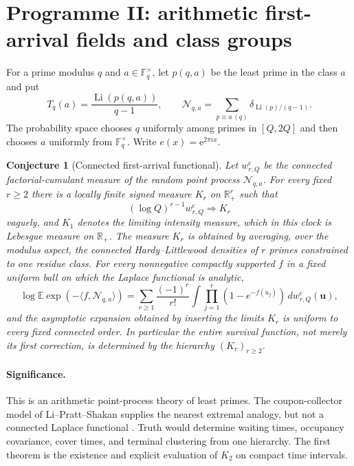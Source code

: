 \documentclass[11pt]{article}
\newtheorem{conjecture}{Conjecture}
\newcommand{\Li}{\operatorname{Li}}
\newcommand{\E}{\mathbb E}
\newcommand{\Fq}{\mathbb F}
\newcommand{\R}{\mathbb R}
\newcommand{\e}{\mathrm e}
\begin{document}
\section{Programme II: arithmetic first-arrival fields and class groups}

For a prime modulus $q$ and $a\in\Fq_q^\times$, let $p(q,a)$ be the least prime in the
class $a$ and put
\[
 T_q(a)=\frac{\Li(p(q,a))}{q-1},\qquad
 \mathcal N_{q,a}=\sum_{p\equiv a\, (q)}
 \delta_{\Li(p)/(q-1)}.
\]
The probability space chooses $q$ uniformly among primes in $[Q,2Q]$ and then chooses
$a$ uniformly from $\Fq_q^\times$.  Write $e(x)=\e^{2\pi ix}$.

\begin{conjecture}[Connected first-arrival functional]\label{c6}
Let $w^{\mathrm c}_{r,Q}$ be the connected factorial-cumulant measure of the random point
process $\mathcal N_{q,a}$.  For every fixed $r\ge2$ there is a locally finite signed
measure $K_r$ on $\R_+^r$ such that
\[
 (\log Q)^{r-1}w^{\mathrm c}_{r,Q}\Longrightarrow K_r
\]
vaguely, and $K_1$ denotes the limiting intensity measure, which in this clock is
Lebesgue measure on $\R_+$.  The measure $K_r$ is obtained by averaging, over the
modulus aspect, the connected Hardy--Littlewood densities of $r$ primes constrained to
one residue class.  For every nonnegative compactly supported $f$ in a fixed uniform ball on which the
Laplace functional is analytic,
\[
 \log\E\exp(-\langle f,\mathcal N_{q,a}\rangle)
 =\sum_{r\ge1}\frac{(-1)^r}{r!}
 \int\prod_{j=1}^r(1-e^{-f(u_j)})\,dw^{\mathrm c}_{r,Q}(\mathbf u),
\]
and the asymptotic expansion obtained by inserting the limits $K_r$ is uniform to every
fixed connected order.  In particular the entire survival function, not merely its
first correction, is determined by the hierarchy $(K_r)_{r\ge2}$.
\end{conjecture}

\paragraph{Significance.}
This is an arithmetic point-process theory of least primes.  The coupon-collector model
of Li--Pratt--Shakan supplies the nearest extremal analogy, but not a connected Laplace
functional \cite{LPS}.  Truth would determine waiting times, occupancy covariance,
cover times, and terminal clustering from one hierarchy.  The first theorem is the
existence and explicit evaluation of $K_2$ on compact time intervals.
\end{document}
